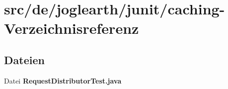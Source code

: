 \section{src/de/joglearth/junit/caching-\/\-Verzeichnisreferenz}
\label{dir_cdcf4a850f1d66d82abb08d0eed030a3}
\subsection*{Dateien}
\begin{DoxyCompactItemize}
\item 
Datei {\bfseries Request\-Distributor\-Test.\-java}
\end{DoxyCompactItemize}
